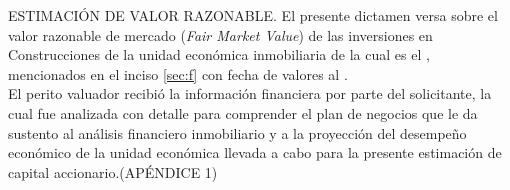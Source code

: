 \textcolor{secundario}{ESTIMACI\'ON DE VALOR RAZONABLE.} El presente dictamen versa sobre el valor razonable de mercado (\textit{\textcolor{principal}{Fair Market Value}}) de las inversiones en Construcciones de la unidad econ\'omica inmobiliaria de la cual es el \empresaSolicitante, mencionados en el inciso \autoref{sec:f} con fecha de valores al \fechaValores.\\[10pt]

El perito valuador recibi\'o la informaci\'on financiera por parte del solicitante, la cual fue analizada con detalle para comprender el plan de negocios que le da sustento al an\'alisis financiero inmobiliario y a la proyecci\'on  del desempe\~no econ\'omico de la unidad econ\'omica llevada a cabo para la presente estimaci\'on de capital accionario.(\textcolor{secundario}{AP\'ENDICE 1})